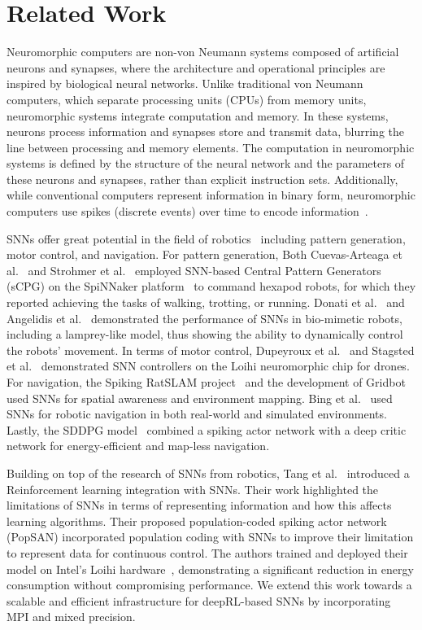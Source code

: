 \section{Related Work}
Neuromorphic computers are non-von Neumann systems composed of artificial neurons and synapses, where the architecture and operational principles are inspired by biological neural networks. Unlike traditional von Neumann computers, which separate processing units (CPUs) from memory units, neuromorphic systems integrate computation and memory. In these systems, neurons process information and synapses store and transmit data, blurring the line between processing and memory elements. The computation in neuromorphic systems is defined by the structure of the neural network and the parameters of these neurons and synapses, rather than explicit instruction sets. Additionally, while conventional computers represent information in binary form, neuromorphic computers use spikes (discrete events) over time to encode information~\cite{b32}.

SNNs offer great potential in the field of robotics~\cite{b1}
including pattern generation, motor control, and navigation. For pattern
generation, Both Cuevas-Arteaga et al.~\cite{b2} and Strohmer et
al.~\cite{b3} employed SNN-based Central Pattern Generators (sCPG) on
the SpiNNaker platform~\cite{b4} to command hexapod robots, for which
they reported achieving the tasks of walking, trotting, or running.
Donati et al.~\cite{b5} and Angelidis et
al.~\cite{b6} demonstrated the performance of SNNs in bio-mimetic
robots, including a lamprey-like model, thus showing the ability to
dynamically control the robots' movement. In terms of motor control,
Dupeyroux et al.~\cite{b7} and Stagsted et al.~\cite{b8} demonstrated
SNN controllers on the Loihi neuromorphic chip for drones. For
navigation, the Spiking RatSLAM project~\cite{b9} and the development of
Gridbot~\cite{b10} used SNNs for spatial awareness and environment
mapping. Bing et al.~\cite{b11} used SNNs for robotic navigation in both
real-world and simulated environments. Lastly, the SDDPG
model~\cite{b12} combined a spiking actor network with a deep critic
network for energy-efficient and map-less navigation.

Building on top of the research of SNNs from robotics, Tang et al.~\cite{b13} introduced a Reinforcement learning integration with SNNs. Their work highlighted the limitations of SNNs in terms of representing information and how this affects learning algorithms. Their proposed population-coded spiking actor network
(PopSAN) incorporated population coding with SNNs to improve their
limitation to represent data for continuous control.
The authors trained and deployed their model on Intel's Loihi
hardware~\cite{b18}, demonstrating a significant reduction in energy
consumption without compromising performance. We extend this work
towards a scalable and efficient infrastructure for deepRL-based SNNs by incorporating MPI and mixed precision.

